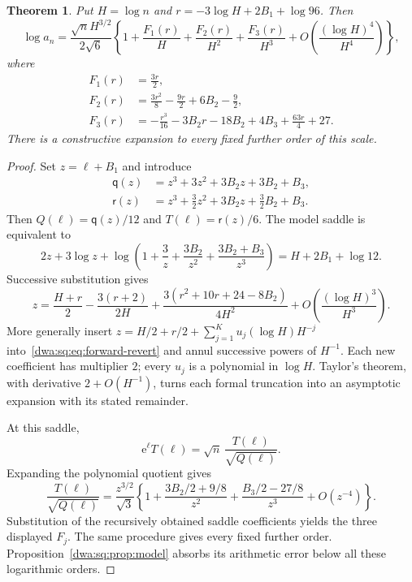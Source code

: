 \documentclass[11pt,letterpaper]{article}
\numberwithin{equation}{section}
\newtheorem{theorem}{Theorem}[section]
\theoremstyle{remark}
\newcommand{\e}{\mathrm e}
\begin{document}
\begin{theorem}\label{dwa:sq:thm:forward}
Put $H=\log n$ and $r=-3\log H+2B_1+\log96$. Then
\begin{equation}\label{dwa:sq:eq:forward}
 \log a_n=\frac{\sqrt n H^{3/2}}{2\sqrt6}
 \left\{1+\frac{F_1(r)}H+\frac{F_2(r)}{H^2}+\frac{F_3(r)}{H^3}
 +O\left(\frac{(\log H)^4}{H^4}\right)\right\},
\end{equation}
where
\begin{align*}
 F_1(r)&=\frac{3r}{2},\\
 F_2(r)&=\frac{3r^2}{8}-\frac{9r}{2}+6B_2-\frac92,\\
 F_3(r)&=-\frac{r^3}{16}-3B_2r-18B_2+4B_3+\frac{63r}{4}+27.
\end{align*}
There is a constructive expansion to every fixed further order of this scale.
\end{theorem}
\begin{proof}
Set $z=\ell+B_1$ and introduce
\begin{align}\label{dwa:sq:eq:qr}
 \mathsf q(z)&=z^3+3z^2+3B_2z+3B_2+B_3,\\
 \mathsf r(z)&=z^3+\frac32z^2+3B_2z+\frac32B_2+B_3.\nonumber
\end{align}
Then $Q(\ell)=\mathsf q(z)/12$ and $T(\ell)=\mathsf r(z)/6$. The model saddle is equivalent to
\begin{equation}\label{dwa:sq:eq:forward-revert}
 2z+3\log z+\log\left(1+\frac3z+\frac{3B_2}{z^2}
 +\frac{3B_2+B_3}{z^3}\right)=H+2B_1+\log12.
\end{equation}
Successive substitution gives
\begin{equation}\label{dwa:sq:eq:z-forward}
 z=\frac{H+r}{2}-\frac{3(r+2)}{2H}
 +\frac{3(r^2+10r+24-8B_2)}{4H^2}
 +O\left(\frac{(\log H)^3}{H^3}\right).
\end{equation}
More generally insert $z=H/2+r/2+\sum_{j=1}^K u_j(\log H)H^{-j}$ into~\eqref{dwa:sq:eq:forward-revert} and annul successive powers of $H^{-1}$. Each new coefficient has multiplier $2$; every $u_j$ is a polynomial in $\log H$. Taylor's theorem, with derivative $2+O(H^{-1})$, turns each formal truncation into an asymptotic expansion with its stated remainder.

At this saddle,
\[
 \e^\ell T(\ell)=\sqrt n\,\frac{T(\ell)}{\sqrt{Q(\ell)}}.
\]
Expanding the polynomial quotient gives
\begin{equation}\label{dwa:sq:eq:forward-quotient}
 \frac{T(\ell)}{\sqrt{Q(\ell)}}
 =\frac{z^{3/2}}{\sqrt3}\left\{1+\frac{3B_2/2+9/8}{z^2}
 +\frac{B_3/2-27/8}{z^3}+O(z^{-4})\right\}.
\end{equation}
Substitution of the recursively obtained saddle coefficients yields the three displayed $F_j$. The same procedure gives every fixed further order. Proposition~\ref{dwa:sq:prop:model} absorbs its arithmetic error below all these logarithmic orders.
\end{proof}
\end{document}
